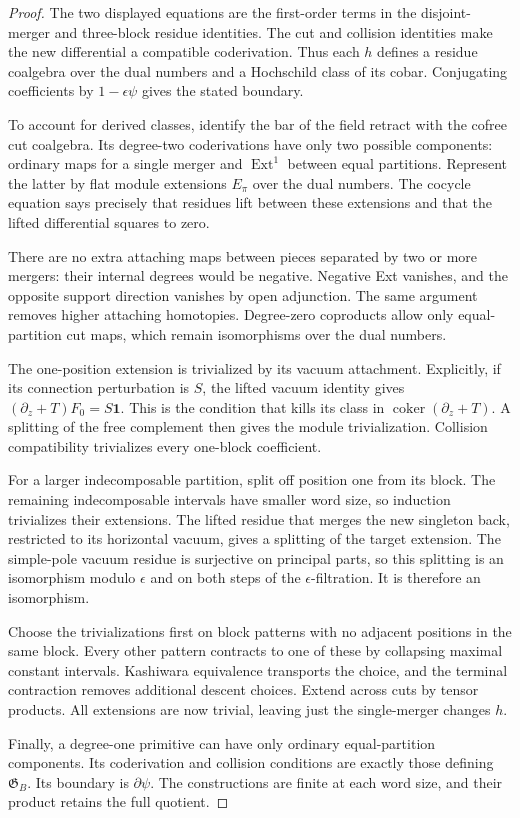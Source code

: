 \begin{proof}
The two displayed equations
are the first-order terms
in the disjoint-merger and
three-block residue identities.
The cut and collision
identities make the new
differential a compatible
coderivation. Thus each
$h$ defines a residue
coalgebra over the dual
numbers and a Hochschild
class of its cobar.
Conjugating coefficients
by $1-\epsilon\psi$ gives
the stated boundary.

To account for derived
classes, identify the bar
of the field retract with
the cofree cut coalgebra.
Its degree-two coderivations
have only two possible
components: ordinary maps
for a single merger and
$\operatorname{Ext}^1$
between equal partitions.
Represent the latter by
flat module extensions
$E_\pi$ over the dual
numbers. The cocycle
equation says precisely
that residues lift between
these extensions and that
the lifted differential
squares to zero.

There are no extra
attaching maps between
pieces separated by two
or more mergers: their
internal degrees would
be negative. Negative
Ext vanishes, and the
opposite support direction
vanishes by open adjunction.
The same argument removes
higher attaching homotopies.
Degree-zero coproducts
allow only equal-partition
cut maps, which remain
isomorphisms over the
dual numbers.

The one-position extension
is trivialized by its
vacuum attachment. Explicitly,
if its connection perturbation
is $S$, the lifted vacuum
identity gives
$(\partial_z+T)F_0=S\mathbf1$.
This is the condition that
kills its class in
$\operatorname{coker}(\partial_z+T)$.
A splitting of the free
complement then gives the
module trivialization.
Collision compatibility
trivializes every one-block
coefficient.

For a larger indecomposable
partition, split off position
one from its block. The
remaining indecomposable
intervals have smaller word
size, so induction trivializes
their extensions. The
lifted residue that merges
the new singleton back,
restricted to its horizontal
vacuum, gives a splitting
of the target extension.
The simple-pole vacuum
residue is surjective on
principal parts, so this
splitting is an isomorphism
modulo $\epsilon$ and on
both steps of the
$\epsilon$-filtration.
It is therefore an
isomorphism.

Choose the trivializations
first on block patterns
with no adjacent positions
in the same block.
Every other pattern
contracts to one of these
by collapsing maximal
constant intervals.
Kashiwara equivalence
transports the choice, and
the terminal contraction
removes additional descent
choices. Extend across
cuts by tensor products.
All extensions are now
trivial, leaving just the
single-merger changes $h$.

Finally, a degree-one
primitive can have only
ordinary equal-partition
components. Its
coderivation and collision
conditions are exactly
those defining $\mathfrak G_B$.
Its boundary is
$\partial\psi$.
The constructions are
finite at each word size,
and their product retains
the full quotient.
\end{proof}

